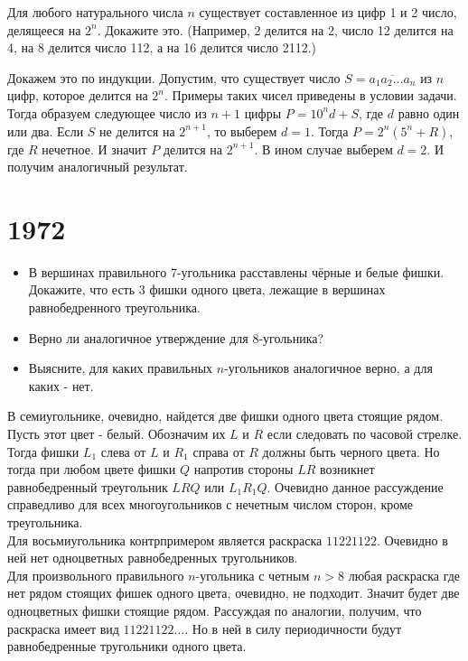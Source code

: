 \documentclass[11pt, a4paper]{template}
\begin{document}
\begin{exercise}[M113]
Для любого натурального числа $n$ существует составленное из цифр 1 и 2 число, делящееся на $2^{n}$. Докажите это. (Например, 2 делится на 2, число 12 делится на 4, на 8 делится число 112, а на 16 делится число 2112.)
\end{exercise}

\begin{solution}
Докажем это по индукции. Допустим, что существует число $S = \overline{a_{1}a_{2}\dots a_{n}}$ из $n$ цифр, которое делится на $2^{n}$. Примеры таких чисел приведены в условии задачи. Тогда образуем следующее число из $n + 1$ цифры $P = 10^{n} d + S$, где $d$ равно один или два. Если $S$ не делится на $2^{n+1}$, то выберем $d = 1$. Тогда $P = 2^{n}(5^{n} + R)$, где $R$ нечетное. И значит $P$ делится на $2^{n+1}$. В ином случае выберем $d = 2$. И получим аналогичный результат.
\end{solution}


\chapter{1972}

\begin{exercise}[M146]
\begin{itemize}
\item В вершинах правильного 7-угольника расставлены чёрные и белые фишки. Докажите, что есть 3 фишки одного цвета, лежащие в вершинах равнобедренного треугольника.
\item Верно ли аналогичное утверждение для 8-угольника?
\item Выясните, для каких правильных $n$-угольников аналогичное верно, а для каких - нет.
\end{itemize}
\end{exercise}

\begin{solution}
В семиугольнике, очевидно, найдется две фишки одного цвета стоящие рядом. Пусть этот цвет - белый. Обозначим их $L$ и $R$ если следовать по часовой стрелке. Тогда фишки $L_{1}$ слева от $L$ и $R_{1}$ справа от $R$ должны быть черного цвета. Но тогда при любом цвете фишки $Q$ напротив стороны $LR$  возникнет равнобедренный треугольник $LRQ$ или $L_{1}R_{1}Q$. Очевидно данное рассуждение справедливо для всех многоугольников с нечетным числом сторон, кроме треугольника. \\
Для восьмиугольника контрпримером является раскраска $11221122$. Очевидно в ней нет одноцветных равнобедренных тругольников. \\
Для произвольного правильного $n$-угольника с четным $n > 8$ любая раскраска где нет рядом стоящих фишек одного цвета, очевидно, не подходит. Значит будет две одноцветных фишки стоящие рядом. Рассуждая по аналогии, получим, что раскраска имеет вид $11221122\dots$. Но в ней в силу периодичности будут равнобедренные тругольники одного цвета.
\end{solution}
\end{document}

